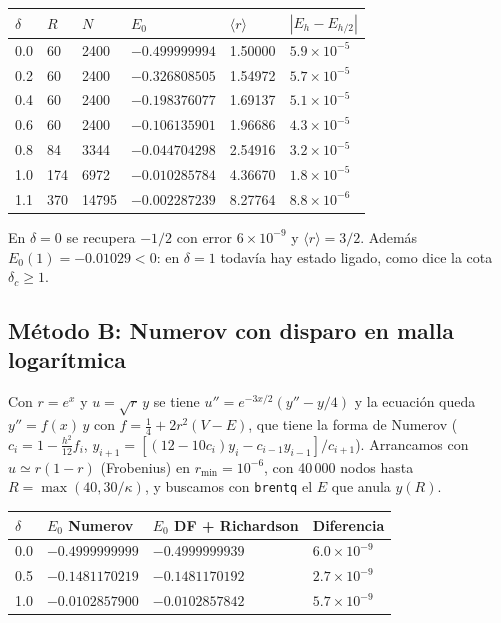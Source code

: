 \documentclass[11pt]{article}
\newcommand{\dc}{\delta_c}
\begin{document}
\begin{table}[H]
\centering
\small
\begin{tabular}{@{}llllll@{}}
\toprule
$\delta$ & $R$ & $N$ & $E_0$ & $\langle r\rangle$ & $|E_h-E_{h/2}|$\\
\midrule
0.0 & 60 & 2400 & $-0.499999994$ & 1.50000 & $5.9\times10^{-5}$\\
0.2 & 60 & 2400 & $-0.326808505$ & 1.54972 & $5.7\times10^{-5}$\\
0.4 & 60 & 2400 & $-0.198376077$ & 1.69137 & $5.1\times10^{-5}$\\
0.6 & 60 & 2400 & $-0.106135901$ & 1.96686 & $4.3\times10^{-5}$\\
0.8 & 84 & 3344 & $-0.044704298$ & 2.54916 & $3.2\times10^{-5}$\\
1.0 & 174 & 6972 & $-0.010285784$ & 4.36670 & $1.8\times10^{-5}$\\
1.1 & 370 & 14795 & $-0.002287239$ & 8.27764 & $8.8\times10^{-6}$\\
\bottomrule
\end{tabular}
\end{table}

En $\delta=0$ se recupera $-1/2$ con error $6\times10^{-9}$ y $\langle r\rangle=3/2$. Además $E_0(1)=-0.01029<0$: en $\delta=1$ todavía hay estado ligado, como dice la cota $\dc\ge1$.

\subsection{Método B: Numerov con disparo en malla logarítmica}

Con $r=e^x$ y $u=\sqrt r\,y$ se tiene $u''=e^{-3x/2}(y''-y/4)$ y la ecuación queda $y''=f(x)\,y$ con $f=\tfrac14+2r^2(V-E)$, que tiene la forma de Numerov ($c_i=1-\tfrac{h^2}{12}f_i$, $y_{i+1}=[(12-10c_i)y_i-c_{i-1}y_{i-1}]/c_{i+1}$). Arrancamos con $u\simeq r(1-r)$ (Frobenius) en $r_{\min}=10^{-6}$, con 40\,000 nodos hasta $R=\max(40,30/\kappa)$, y buscamos con \texttt{brentq} el $E$ que anula $y(R)$.

\begin{table}[H]
\centering
\small
\begin{tabular}{@{}llll@{}}
\toprule
$\delta$ & $E_0$ Numerov & $E_0$ DF + Richardson & Diferencia\\
\midrule
0.0 & $-0.4999999999$ & $-0.4999999939$ & $6.0\times10^{-9}$\\
0.5 & $-0.1481170219$ & $-0.1481170192$ & $2.7\times10^{-9}$\\
1.0 & $-0.0102857900$ & $-0.0102857842$ & $5.7\times10^{-9}$\\
\bottomrule
\end{tabular}
\end{table}
\end{document}
